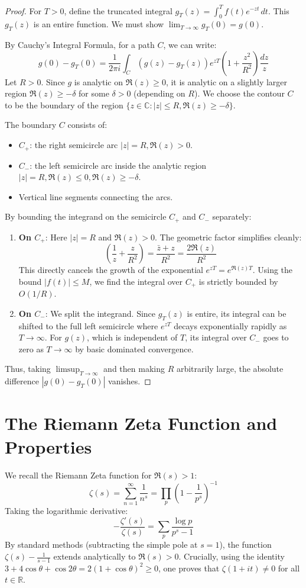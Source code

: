 \documentclass[12pt]{article}
\begin{document}
\begin{proof}
For $T > 0$, define the truncated integral $g_T(z) = \int_0^T f(t) e^{-zt} \, dt$. This $g_T(z)$ is an entire function. We must show $\lim_{T \to \infty} g_T(0) = g(0)$. 

By Cauchy's Integral Formula, for a path $C$, we can write:
\[ g(0) - g_T(0) = \frac{1}{2\pi i} \int_{C} \left( g(z) - g_T(z) \right) e^{zT} \left( 1 + \frac{z^2}{R^2} \right) \frac{dz}{z} \]
Let $R > 0$. Since $g$ is analytic on $\Re(z) \ge 0$, it is analytic on a slightly larger region $\Re(z) \ge -\delta$ for some $\delta > 0$ (depending on $R$). We choose the contour $C$ to be the boundary of the region $\{z \in \mathbb{C} : |z| \le R, \Re(z) \ge -\delta\}$.

The boundary $C$ consists of:
\begin{itemize}
    \item $C_+$: the right semicircle arc $|z| = R, \Re(z) > 0$.
    \item $C_-$: the left semicircle arc inside the analytic region $|z| = R, \Re(z) \le 0, \Re(z) \ge -\delta$.
    \item Vertical line segments connecting the arcs.
\end{itemize}

By bounding the integrand on the semicircle $C_+$ and $C_-$ separately:
\begin{enumerate}
    \item \textbf{On $C_+$}: Here $|z| = R$ and $\Re(z) > 0$. The geometric factor simplifies cleanly:
    \[ \left( \frac{1}{z} + \frac{z}{R^2} \right) = \frac{\bar{z} + z}{R^2} = \frac{2 \Re(z)}{R^2} \]
    This directly cancels the growth of the exponential $e^{zT} = e^{\Re(z)T}$. Using the bound $|f(t)| \le M$, we find the integral over $C_+$ is strictly bounded by $O(1/R)$.
    
    \item \textbf{On $C_-$}: We split the integrand. Since $g_T(z)$ is entire, its integral can be shifted to the full left semicircle where $e^{zT}$ decays exponentially rapidly as $T \to \infty$. For $g(z)$, which is independent of $T$, its integral over $C_-$ goes to zero as $T \to \infty$ by basic dominated convergence.
\end{enumerate}

Thus, taking $\limsup_{T \to \infty}$ and then making $R$ arbitrarily large, the absolute difference $|g(0) - g_T(0)|$ vanishes.
\end{proof}

\section{The Riemann Zeta Function and Properties}
We recall the Riemann Zeta function for $\Re(s) > 1$:
\[ \zeta(s) = \sum_{n=1}^\infty \frac{1}{n^s} = \prod_p \left(1 - \frac{1}{p^s}\right)^{-1} \]
Taking the logarithmic derivative:
\[ -\frac{\zeta'(s)}{\zeta(s)} = \sum_p \frac{\log p}{p^s - 1} \]
By standard methods (subtracting the simple pole at $s=1$), the function $\zeta(s) - \frac{1}{s-1}$ extends analytically to $\Re(s) > 0$. Crucially, using the identity $3 + 4\cos \theta + \cos 2\theta = 2(1+\cos\theta)^2 \ge 0$, one proves that $\zeta(1+it) \neq 0$ for all $t \in \mathbb{R}$.
\end{document}
